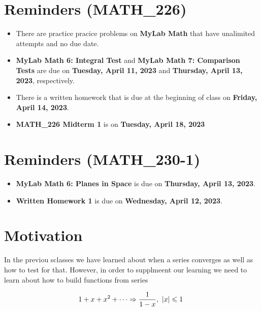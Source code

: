 \documentclass{report}
\begin{document}
\begin{sloppypar}
\section{Reminders (MATH\_226)}
\begin{itemize}
  \item There are practice pracice problems on \textbf{MyLab Math} that have unalimited attempts and no due date.
  \item \textbf{MyLab Math 6: Integral Test} and
        \textbf{MyLab Math 7: Comparison Tests} are due on
        \textbf{Tuesday, April 11, 2023} and \textbf{Thursday,
        April 13, 2023}, respectively.
  \item There is a written homework that is due at the beginning of class on \textbf{Friday, April 14, 2023}.
        \item \textbf{MATH\_226 Midterm 1} is on \textbf{Tuesday, April 18, 2023}
\end{itemize}

\section{Reminders (MATH\_230-1)}
\begin{itemize}
  \item \textbf{MyLab Math 6: Planes in Space} is due on
        \textbf{Thursday, April 13, 2023}.
  \item \textbf{Written Homework 1} is due on
        \textbf{Wednesday, April 12, 2023}.
\end{itemize}



\section{Motivation}
In the previou sclasses we have learned about when a series converges as well as how to test for that.
However, in order to supplmeent our learning we need to learn about how to build functions from series

\[ 1 + x + x^{2} + \cdots \Rightarrow \frac{1}{1-x}, \textrm{ $ |x | \leq 1 $ } \]


\end{sloppypar}
\end{document}
